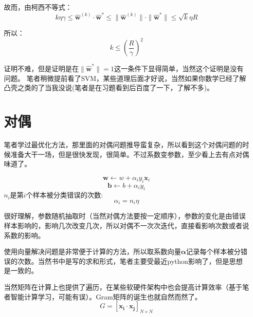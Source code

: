 \documentclass{article}
\begin{document}
故而，由柯西不等式：
\[k\eta\gamma \le \widehat{\boldsymbol{w}}^{(k)}\cdot \widehat{\boldsymbol{w}}^* \le \|\widehat{\boldsymbol{w}}^{(k)}\|\cdot\|\widehat{\boldsymbol{w}}^*\|\le \sqrt{k}\eta R
\]

所以：
\[k \le (\frac{R}{\gamma})^2\]

证明不难，但是证明是在$\|\boldsymbol{\widehat{w}^*}\|=1$这一条件下显得简单，当然这个证明是没有问题。
笔者稍微提前看了SVM，某些道理后面才好说，当然如果你数学已经了解凸壳之类的了当我没说(笔者是在习题看到后百度了一下，了解不多)。

\section{对偶}
笔者学过最优化方法，那里面的对偶问题推导蛮复杂，所以看到这个对偶问题的时候准备大干一场，但是很快发现，很简单。不过系数变参数，至少看上去有点对偶味道了。

\[\boldsymbol{w}\leftarrow w+\alpha_i y_i \boldsymbol{x}_i\]
\[\boldsymbol{b}\leftarrow b+\alpha_i y_i\]
$n_i$是第$i$个样本被分类错误的次数:
\[\alpha_i=n_i \eta\]

很好理解，参数随机抽取时（当然对偶方法要按一定顺序），参数的变化是由错误样本影响的，影响几次改变几次，所以对偶不一次次迭代，直接看影响次数或者说系数的影响。

使用向量解决问题是非常便于计算的方法，所以取系数向量$\boldsymbol{\alpha}$记录每个样本被分错误的次数。当然书中是写的求和形式，笔者主要受最近python影响了，但是思想是一致的。

当然矩阵在计算上也提供了遍历，在某些软硬件架构中也会提高计算效率（基于笔者智能计算学习，可能有误）。Gram矩阵的诞生也就自然而然了。
\[G=[\boldsymbol{x_i}\cdot\boldsymbol{x_j}]_{N\times N}\]
\end{document}
